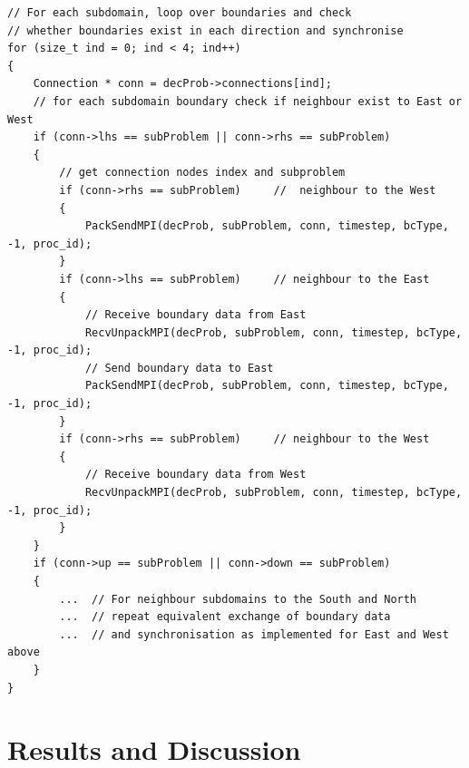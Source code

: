 \documentclass[conference,compsoc]{IEEEtran}
\begin{document}
\begin{lstlisting}[caption= Sample MPI implementation of boundary synchronization
, label=boundMPI]
// For each subdomain, loop over boundaries and check
// whether boundaries exist in each direction and synchronise
for (size_t ind = 0; ind < 4; ind++)  
{   
    Connection * conn = decProb->connections[ind];  
    // for each subdomain boundary check if neighbour exist to East or West  
    if (conn->lhs == subProblem || conn->rhs == subProblem)  
    {
        // get connection nodes index and subproblem
        if (conn->rhs == subProblem)     //  neighbour to the West
        {
            PackSendMPI(decProb, subProblem, conn, timestep, bcType, -1, proc_id);
        }
        if (conn->lhs == subProblem)     // neighbour to the East 
        {
            // Receive boundary data from East 
            RecvUnpackMPI(decProb, subProblem, conn, timestep, bcType, -1, proc_id);
            // Send boundary data to East
            PackSendMPI(decProb, subProblem, conn, timestep, bcType, -1, proc_id);
        }
        if (conn->rhs == subProblem)     // neighbour to the West
        {
            // Receive boundary data from West 
            RecvUnpackMPI(decProb, subProblem, conn, timestep, bcType, -1, proc_id);
        }
    } 
    if (conn->up == subProblem || conn->down == subProblem)  
    {
        ...  // For neighbour subdomains to the South and North
        ...  // repeat equivalent exchange of boundary data 
        ...  // and synchronisation as implemented for East and West above
    }     
}
\end{lstlisting}







\section{Results and Discussion}
\end{document}
